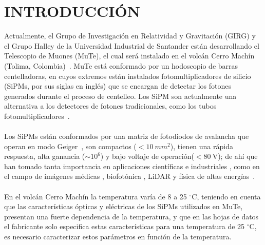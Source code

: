 
\chapter*{INTRODUCCIÓN}
\label{Cap:Introduccion}
Actualmente, el Grupo de Investigación en Relatividad y Gravitación (GIRG) y el Grupo Halley de la Universidad Industrial de Santander están desarrollando el Telescopio de Muones (MuTe), el cual será instalado en el volcán  Cerro Machín (Tolima, Colombia)~\citep{Mute_oficial}. MuTe está conformado por un hodoscopio de barras centelladoras, en cuyos extremos están instalados fotomultiplicadores de silicio (SiPMs, por sus siglas en inglés) que se encargan de detectar los fotones generados durante el proceso de centelleo. Los  SiPM son actualmente una alternativa a los detectores de fotones tradicionales, como los tubos fotomultiplicadores~\citep{Intro_SIPM_Sensl}. \\ \\
Los SiPMs están conformados por una matriz de fotodiodos de avalancha que operan en modo Geiger~\citep{Sipm_S13360_1350CS_datasheet}, son compactos ($< 10~mm^2$), tienen una rápida respuesta, alta ganancia ($\sim 10^6$) y bajo voltaje de operación($ < 80~\mbox{V}$); de ahí que han tomado tanta importancia en aplicaciones científicas e industriales \citep{Blue_SIPM}, como en el campo de imágenes médicas \citep{SiPM_PET,SiPM_3D_img}, biofotónica \citep{SiPM_bio,SiPM_bio2}, LiDAR \citep{SiPM_Lidar,SiPM_3D_img} y física de altas energías~\citep{minimute,Mute_oficial}.\\  \\%
 En el volcán Cerro Machín la temperatura varía de 8 a 25 $^{\circ}$C, teniendo en cuenta que las características ópticas y eléctricas de los SiPMs utilizados en MuTe, presentan una fuerte dependencia de la temperatura, y que en las hojas de datos el fabricante solo especifica estas características para una temperatura de 25 $^{\circ}$C, es necesario caracterizar estos parámetros en función de la temperatura. \\ \\  
